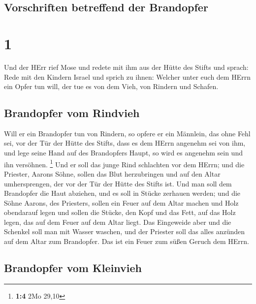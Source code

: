 \hypertarget{vorschriften-betreffend-der-brandopfer}{%
\subsection{Vorschriften betreffend der
Brandopfer}\label{vorschriften-betreffend-der-brandopfer}}

\hypertarget{section}{%
\section{1}\label{section}}

 Und der HErr rief Mose und redete mit ihm aus der Hütte
des Stifts und sprach:  Rede mit den Kindern Israel und
sprich zu ihnen: Welcher unter euch dem HErrn ein Opfer tun will, der
tue es von dem Vieh, von Rindern und Schafen.

\hypertarget{brandopfer-vom-rindvieh}{%
\subsection{Brandopfer vom Rindvieh}\label{brandopfer-vom-rindvieh}}

 Will er ein Brandopfer tun von Rindern, so opfere er ein
Männlein, das ohne Fehl sei, vor der Tür der Hütte des Stifts, dass es
dem HErrn angenehm sei von ihm,  und lege seine Hand auf
des Brandopfers Haupt, so wird es angenehm sein und ihn versöhnen.
\footnote{\textbf{1:4} 2Mo 29,10}  Und er soll das junge
Rind schlachten vor dem HErrn; und die Priester, Aarons Söhne, sollen
das Blut herzubringen und auf den Altar umhersprengen, der vor der Tür
der Hütte des Stifts ist.  Und man soll dem Brandopfer die
Haut abziehen, und es soll in Stücke zerhauen werden;  und
die Söhne Aarons, des Priesters, sollen ein Feuer auf dem Altar machen
und Holz obendarauf legen  und sollen die Stücke, den Kopf
und das Fett, auf das Holz legen, das auf dem Feuer auf dem Altar liegt.
 Das Eingeweide aber und die Schenkel soll man mit Wasser
waschen, und der Priester soll das alles anzünden auf dem Altar zum
Brandopfer. Das ist ein Feuer zum süßen Geruch dem HErrn.

\hypertarget{brandopfer-vom-kleinvieh}{%
\subsection{Brandopfer vom Kleinvieh}\label{brandopfer-vom-kleinvieh}}

